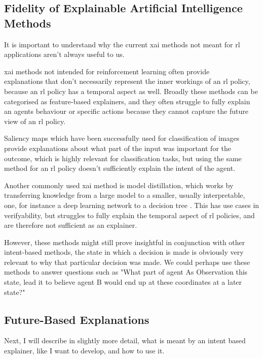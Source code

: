 \documentclass[UKenglish]{uiomasterthesis}
\begin{document}
\medskip

\subsection{Fidelity of Explainable Artificial Intelligence Methods}
It is important to understand why the current \ac{xai} methods not meant for \ac{rl} applications aren't always useful to us.

\ac{xai} methods not intended for reinforcement learning often provide\\ explanations that don't necessarily represent the inner workings of an \ac{rl} policy, because an \ac{rl} policy has a temporal aspect as well. Broadly these methods can be categorised as feature-based explainers, and they often struggle to fully explain an agents behaviour or specific actions because they cannot capture the future view of an \ac{rl} policy. 

Saliency maps which have been successfully used for classification of images provide explanations about what part of the input was important for the outcome, which is highly relevant for classification tasks, but using the same method for an \ac{rl} policy doesn't sufficiently explain the intent of the agent\cite{atrey2020exploratory}.

Another commonly used \ac{xai} method is model distillation, which works by transferring knowledge from a large model to a smaller, usually interpretable, one, for instance a deep learning network to a decision tree \cite{bastani2019verifiable}. This has use cases in verifyability, but struggles to fully explain the temporal aspect of \ac{rl} policies, and are therefore not sufficient as an explainer.

However, these methods might still prove insightful in conjunction with other intent-based methods, the state in which a decision is made is obviously very relevant to why that particular decision was made. We could perhaps use these methods to answer questions such as "What part of agent As Observation this state, lead it to believe agent B would end up at these coordinates at a later state?"
\medskip

\subsection{Future-Based Explanations}
Next, I will describe in slightly more detail, what is meant by an intent based explainer, like I want to develop, and how to use it.
\end{document}
